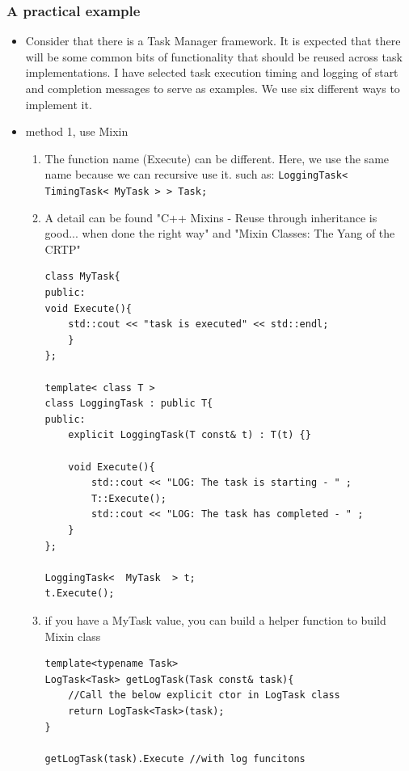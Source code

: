\documentclass[a4paper,11pt,twoside]{book}
\begin{document}
\subsubsection{A practical example}
\begin{itemize}
	\item  Consider that there is a Task Manager framework. It is expected that there will be some common bits of functionality that should be reused across task implementations. I have selected task execution timing and logging of start and completion messages to serve as examples. We use six different ways to implement it.
	
	\item method 1, use Mixin
	\begin{enumerate}
		
		\item The function name (Execute) can be different. Here, we use the same name because we can recursive use it. such as: \texttt{LoggingTask< TimingTask< MyTask > > Task;}
		
		\item A detail can be found "C++ Mixins - Reuse through inheritance is good... when done the right way" and "Mixin Classes: The Yang of the CRTP"
		
\begin{lstlisting}[numbers=none]
class MyTask{
public:
void Execute(){
	std::cout << "task is executed" << std::endl;
	}
};
		
template< class T >
class LoggingTask : public T{
public:
	explicit LoggingTask(T const& t) : T(t) {}
			
	void Execute(){
		std::cout << "LOG: The task is starting - " ;
		T::Execute(); 
		std::cout << "LOG: The task has completed - " ;
	}
};
		
LoggingTask<  MyTask  > t;
t.Execute();
\end{lstlisting}
		
		\item if you have a MyTask value, you can build a helper function to build Mixin class 
\begin{lstlisting}[numbers=none]
template<typename Task>
LogTask<Task> getLogTask(Task const& task){
	//Call the below explicit ctor in LogTask class
	return LogTask<Task>(task);
}
		
getLogTask(task).Execute //with log funcitons
\end{lstlisting}
		
	\end{enumerate}
	

\end{itemize}
\end{document}
